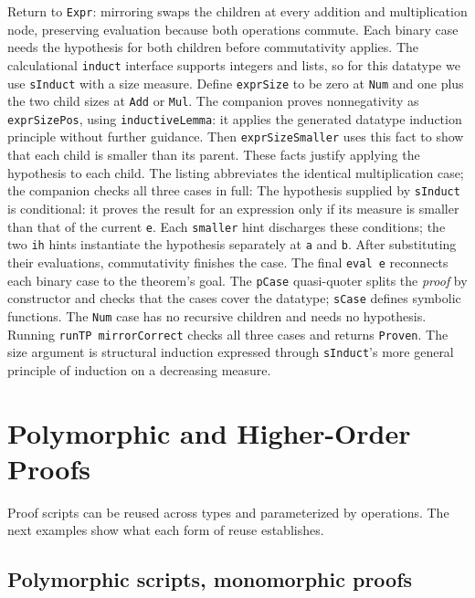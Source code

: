 \documentclass[acmsmall,screen,review,anonymous,nonacm]{acmart}
\newcommand{\code}[1]{\texttt{#1}}
\begin{document}
Return to \code{Expr}: mirroring swaps the children at every addition and
multiplication node, preserving evaluation because both operations commute.
Each binary case needs the hypothesis for both children before commutativity applies.
The calculational \code{induct} interface supports integers and lists, so for
this datatype we use \code{sInduct} with a size measure.
Define \code{exprSize} to be zero at \code{Num} and one plus the
two child sizes at \code{Add} or \code{Mul}. The companion proves nonnegativity
as \code{exprSizePos}, using \code{inductiveLemma}: it applies the generated
datatype induction principle without further guidance. Then
\code{exprSizeSmaller} uses this fact to show that each child is smaller than
its parent. These facts justify applying the hypothesis to each child.
The listing abbreviates the identical multiplication case; the companion
checks all three cases in full:
The hypothesis supplied by \code{sInduct} is conditional: it proves the result
for an expression only if its measure is smaller than that of the current
\code{e}. Each \code{smaller} hint discharges these conditions; the two
\code{ih} hints instantiate the hypothesis separately at \code{a} and \code{b}.
After substituting their evaluations, commutativity finishes the case.
The final \code{eval e} reconnects each binary case to the theorem's goal.
The \code{pCase} quasi-quoter splits the \emph{proof} by constructor and checks
that the cases cover the datatype; \code{sCase} defines symbolic functions.
The \code{Num} case has no recursive children and needs no hypothesis.
Running \code{runTP mirrorCorrect} checks all three cases and returns
\code{Proven}. The size argument is structural induction expressed through
\code{sInduct}'s more general principle of induction on a decreasing measure.

\section{Polymorphic and Higher-Order Proofs}
\label{sec:higherorder}

Proof scripts can be reused across types and parameterized by operations.
The next examples show what each form of reuse establishes.

\subsection{Polymorphic scripts, monomorphic proofs}
\label{sec:polymorphic}
\end{document}
